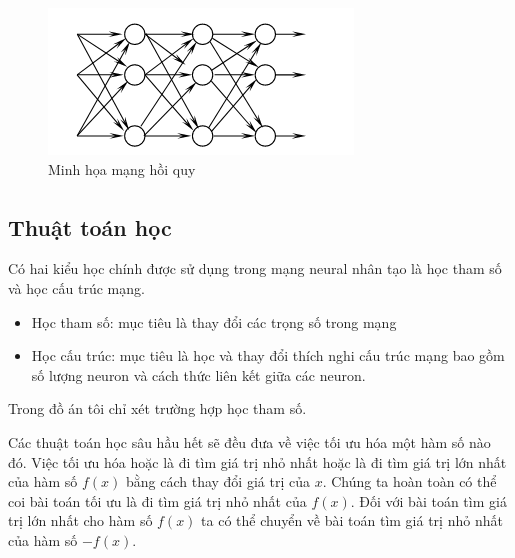 \documentclass[fontsize=12pt]{scrartcl}
\begin{document}
\begin{figure}
     \includegraphics[width=\textwidth]{img/rnn_form}
      \caption{Minh họa mạng hồi quy}
       \label{fig:rnn_form}
\end{figure}
\subsection{Thuật toán học\textsuperscript{\cite{Goodfellow-et-al-2016,khoattq}}}
Có hai kiểu học chính được sử dụng trong mạng neural nhân tạo là học tham số và học cấu trúc mạng.
\begin{itemize}
\item Học tham số: mục tiêu là thay đổi các trọng số trong mạng
\item Học cấu trúc: mục tiêu là học và thay đổi thích nghi cấu trúc mạng bao gồm số lượng neuron và cách thức liên kết giữa các neuron.
\end{itemize}
Trong đồ án tôi chỉ xét trường hợp học tham số.
\par
Các thuật toán học sâu hầu hết sẽ đều đưa về việc tối ưu hóa một hàm số nào đó. Việc tối ưu hóa hoặc là đi tìm giá trị nhỏ nhất hoặc là đi tìm giá trị lớn nhất của hàm số $f(x)$ bằng cách thay đổi giá trị của $x$. Chúng ta hoàn toàn có thể coi bài toán tối ưu là đi tìm giá trị nhỏ nhất của  $f(x)$. Đối với bài toán tìm giá trị lớn nhất cho hàm số $f(x)$ ta có thể chuyển về bài toán tìm giá trị nhỏ nhất của hàm số $-f(x)$.
\end{document}
